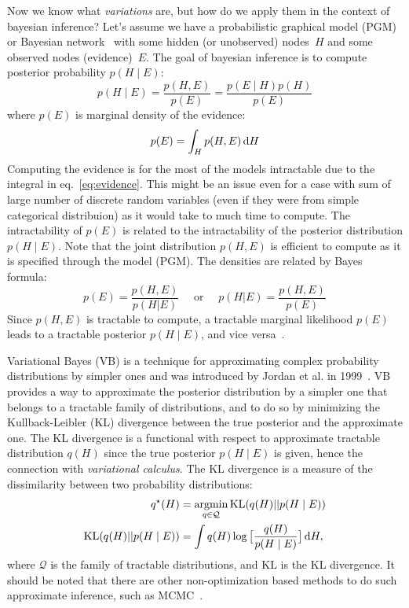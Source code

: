 Now we know what \textit{variations} are, but how do we apply them in the context of bayesian inference? Let's assume we have a probabilistic
graphical model (PGM) or Bayesian network~\cite{graphical-models-2023} with some hidden (or unobserved) nodes~$H$ and some observed nodes (evidence)~$E$. The goal 
of bayesian inference is to compute posterior probability $p(H\mid E)$:
$$
p(H \mid E) = \frac{p(H,E)}{p(E)} = \frac{p(E\mid H) p(H)}{p(E)}
$$ 
where $p(E)$ is marginal density of the evidence:
\begin{equation}
    p(E) = \int_{H} p(H,E)\, \mbox{\rm d}H \label{eq:evidence}
\end{equation}
Computing the evidence is for the most of the models intractable due to the integral in eq.~\ref{eq:evidence}. This might be an issue even for a
case with sum of large number of discrete random variables (even if they were from simple categorical distribuion) as it would 
take to much time to compute. The intractability of $p(E)$ is related to the intractability of the posterior distribution $p(H \mid E)$. 
Note that the joint distribution $p(H, E)$ is efficient to compute as it is specified through the model (PGM). The densities are related by Bayes formula:
$$
p(E) = \frac{p(H,E)}{p(H|E)} \quad\text{ or }\quad p(H|E) = \frac{p(H,E)}{p(E)} 
$$
Since $p(H, E)$ is tractable to compute, a tractable marginal likelihood $p(E)$ leads to a tractable posterior $p(H \mid E)$, and vice versa~\cite{intro-vae-2019,vb-intro-1999}.
 
Variational Bayes (VB) is a technique for approximating complex probability distributions by simpler ones and was introduced by Jordan et al. in 1999~\cite{vb-intro-1999}. 
VB provides a way to approximate the posterior distribution by a simpler one that belongs to a tractable family of distributions, and to do so
by minimizing the Kullback-Leibler (KL) divergence between the true posterior and the approximate one. The KL divergence is a functional with respect 
to approximate tractable distribution $q(H)$ since the true posterior $p(H \mid E)$ is given, hence the connection with \textit{variational calculus}.  
The KL divergence is a measure of the dissimilarity between two probability distributions:
\begin{align*}
q^\star(H) &= \mathop{\rm argmin}_{q \in \mathcal{Q}} \mathrm{KL}(q(H) || p(H  \mid  E)) \\
\mathrm{KL}(q(H) || p(H \mid E)) &= \int q(H) \log \big[ \frac{q(H)}{p(H \mid E)} \big]\,\mbox{\rm d}H,
\end{align*}
where $\mathcal{Q}$ is the family of tractable distributions, and $\mathrm{KL}$ is the KL divergence. It should be noted that there are other 
non-optimization based methods to do such approximate inference, such as MCMC~\cite{wiki-mcmc-2023}. 


